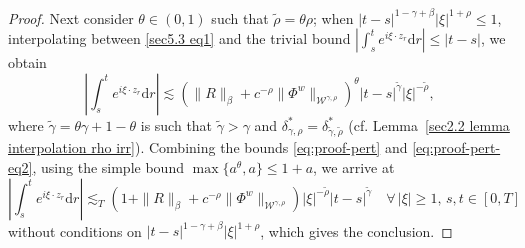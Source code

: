 \documentclass[10pt]{article}
\newcommand{\comma}{{,}}
\newcommand{\mathd}{\mathrm{d}}
\begin{document}
\begin{proof}
  Next consider $\theta\in (0,1)$ such that $\tilde{\rho} =\theta \rho$; when $|t-s|^{1-\gamma+\beta}|\xi|^{1+\rho}\leqslant 1$, interpolating between \eqref{sec5.3 eq1} and the trivial bound $|\int_s^t e^{i\xi\cdot z_r} \mathd r|\leqslant |t-s|$, we obtain
%
\begin{equation}\label{eq:proof-pert-eq2}
	\left| \int_s^t e^{i \xi \cdot z_r} \mathd r \right| \lesssim (\| R
    \|_{\beta} + c^{- \rho} \| \Phi^w \|_{\mathcal{W}^{\gamma, \rho}})^{\theta} | t - s |^{\tilde\gamma} | \xi|^{- \tilde\rho},
\end{equation}
%
where $\tilde\gamma=\theta \gamma+1-\theta$ is such that $\tilde\gamma>\gamma$ and $\delta_{\gamma,\rho}^\ast=\delta_{\tilde\gamma,\tilde\rho}^\ast$ (cf. Lemma~\ref{sec2.2 lemma interpolation rho irr}).
Combining the bounds \eqref{eq:proof-pert} and \eqref{eq:proof-pert-eq2}, using the simple bound $\max\{a^\theta,a\}\leqslant 1+a$, we arrive at
%
  \[ \left| \int_s^t e^{i \xi \cdot z_r} \mathd r \right| \lesssim_T (1 + \| R
     \|_{\beta} + c^{- \rho}\| \Phi^w \|_{\mathcal{W}^{\gamma, \rho}} )
     | \xi |^{- \tilde{\rho}} | t - s |^{\tilde{\gamma}} \quad \forall \, |
     \xi | \geqslant 1, \, s, t \in [0, T] \]
  without conditions on $| t - s |^{1 - \gamma + \beta} | \xi |^{1 + \rho}$,
  which gives the conclusion.
\end{proof}
\end{document}
